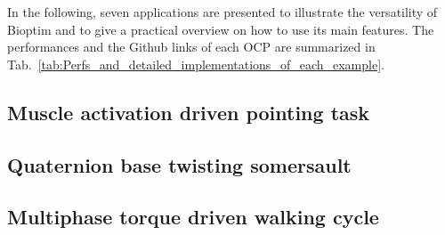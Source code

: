 In the following, seven applications are presented to illustrate the versatility of Bioptim and to give a practical overview on how to use its main features.
The performances and the Github links of each OCP are summarized in Tab.~\ref{tab:Perfs_and_detailed_implementations_of_each_example}.


\subsection{Muscle activation driven pointing task}


\subsection{Quaternion base twisting somersault}


\subsection{Multiphase torque driven walking cycle}



